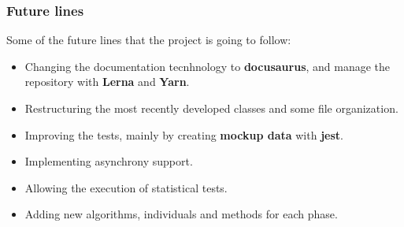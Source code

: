 \documentclass{beamer}
\begin{document}
\begin{frame}
\frametitle{Future lines}
 
 Some of the future lines that the project is going to follow:
 
 \begin{itemize}
     \item Changing the documentation tecnhnology to \textbf{docusaurus}, and manage the repository with \textbf{Lerna} and \textbf{Yarn}.
     \item Restructuring the most recently developed classes and some file organization.
     \item Improving the tests, mainly by creating \textbf{mockup data} with \textbf{jest}.
     \item Implementing asynchrony support.
     \item Allowing the execution of statistical tests.
     \item Adding new algorithms, individuals and methods for each phase.
 \end{itemize}
 
\end{frame}
\end{document}
